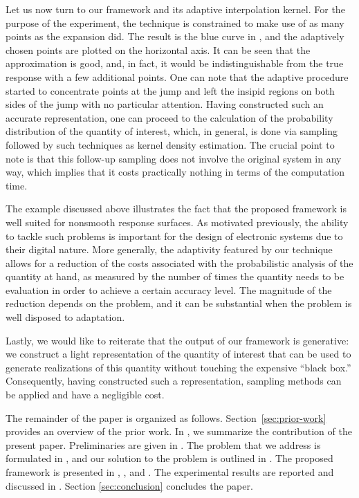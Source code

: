 Let us now turn to our framework and its adaptive interpolation kernel. For the
purpose of the experiment, the technique is constrained to make use of as many
points as the  expansion did. The result is the blue curve in
, and the adaptively chosen points are plotted on the
horizontal axis. It can be seen that the approximation is good, and, in fact, it
would be indistinguishable from the true response with a few additional points.
One can note that the adaptive procedure started to concentrate points at the
jump and left the insipid regions on both sides of the jump with no particular
attention. Having constructed such an accurate representation, one can proceed
to the calculation of the probability distribution of the quantity of interest,
which, in general, is done via sampling followed by such techniques as kernel
density estimation. The crucial point to note is that this follow-up sampling
does not involve the original system in any way, which implies that it costs
practically nothing in terms of the computation time.

The example discussed above illustrates the fact that the proposed framework is
well suited for nonsmooth response surfaces. As motivated previously, the
ability to tackle such problems is important for the design of electronic
systems due to their digital nature. More generally, the adaptivity featured by
our technique allows for a reduction of the costs associated with the
probabilistic analysis of the quantity at hand, as measured by the number of
times the quantity needs to be evaluation in order to achieve a certain accuracy
level. The magnitude of the reduction depends on the problem, and it can be
substantial when the problem is well disposed to adaptation.

Lastly, we would like to reiterate that the output of our framework is
generative: we construct a light representation of the quantity of interest that
can be used to generate realizations of this quantity without touching the
expensive ``black box.'' Consequently, having constructed such a representation,
sampling methods can be applied and have a negligible cost.

The remainder of the paper is organized as follows. Section~\ref{sec:prior-work}
provides an overview of the prior work. In , we summarize the
contribution of the present paper. Preliminaries are given in
. The problem that we address is formulated in
, and our solution to the problem is outlined in .
The proposed framework is presented in , ,
and . The experimental results are reported and discussed in
. Section \ref{sec:conclusion} concludes the paper.
